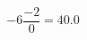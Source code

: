 \documentclass[preview]{standalone}
\begin{document}
\begin{align*}
-6 \dfrac{ -2 }{0}= 40.0
\end{align*}
\end{document}
